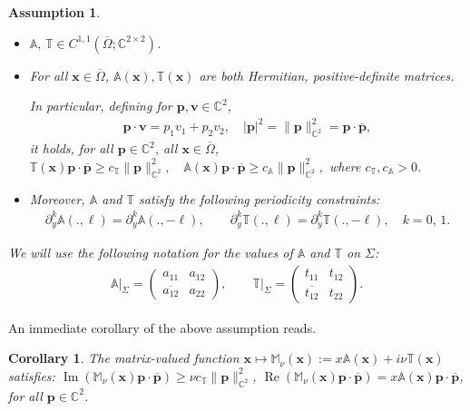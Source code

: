 \documentclass[report]{elsarticle}
\newtheorem{assumption}[theorem]{Assumption}
\newtheorem{corollary}[theorem]{Corollary}
\numberwithin{theorem}{section}
\newcommand{\bx}{\mathbf{x}}
\renewcommand{\Im}{\operatorname{Im}}
\renewcommand{\Re}{\operatorname{Re}}
\renewcommand{\vec}[1]{\mathbf{#1}}
\begin{document}
\begin{assumption}
	\label{assump:matrices}
	\begin{itemize}
		\item $\mathbb{A}, \, \mathbb{T}\in {C}^{1,1}(\overline{\Omega}; \mathbb{C}^{2\times 2})$. 
		\item For all $\bx\in \overline{\Omega}$, $\mathbb{A}(\bx), \mathbb{T}(\bx)$ are both Hermitian, positive-definite matrices. 
		
		
		In particular,
		defining for $\vec{p}, \vec{v}\in \mathbb{C}^2$, 
		\begin{align*}
			\vec{p}\cdot \vec{v}=p_1v_1+p_2v_2,\quad |\vec{p}|^2=\|\vec{p}\|_{\mathbb{C}^2}^2=\vec{p}\cdot\overline{\vec{p}},
		\end{align*}
		it holds, for all $\vec{p}\in \mathbb{C}^2$, all $\vec{x}\in \overline{\Omega}$,  $
		\mathbb{T}(\bx)\vec{p}\cdot\overline{\vec{p}}\geq c_{\mathbb{T}}\|\vec{p}\|^2_{\mathbb{C}^2}, \quad 			\mathbb{A}(\bx)\vec{p}\cdot\overline{\vec{p}}\geq c_{\mathbb{A}}\|\vec{p}\|^2_{\mathbb{C}^2}, $ where $c_{\mathbb{T}}, c_{\mathbb{A}}>0$. 
		\item  Moreover, $\mathbb{A}$ and $\mathbb{T}$ satisfy the following periodicity constraints: 
		\begin{align*}
			\partial_y^k\mathbb{A}(.,\ell)=	\partial_y^k\mathbb{A}(.,-\ell), \qquad 	\partial_y^k\mathbb{T}(.,\ell)=	\partial_y^k\mathbb{T}(.,-\ell), \quad k=0,\,1. 
		\end{align*}
	\end{itemize}
	We will use the following notation for the values of $\mathbb{A}$ and $\mathbb{T}$ on $\Sigma$:
	\begin{align*}
		\left.	\mathbb{A}\right|_{\Sigma}=\left(
		\begin{matrix}
			a_{11} & a_{12}\\
			\overline{a_{12}} & a_{22}
		\end{matrix}
		\right), \qquad \left.	\mathbb{T}\right|_{\Sigma}=\left(
		\begin{matrix}
			t_{11} & t_{12}\\
			\overline{t_{12}} & t_{22}
		\end{matrix}
		\right).
	\end{align*}
\end{assumption}
An immediate corollary of the above assumption reads.
\begin{corollary}
	\label{cor:M}
	The matrix-valued function  $\vec{x}\mapsto\mathbb{M}_{\nu}(\vec{x}):=x\mathbb{A}(\vec{x})+i\nu\mathbb{T}(\vec{x})$ satisfies: 
	$\operatorname{\Im}\left(\mathbb{M}_{\nu}(\vec{x})\vec{p}\cdot\overline{\vec{p}}\right)\geq \nu c_{\mathbb{T}}\|\vec{p}\|^2_{\mathbb{C}^2}$, $\operatorname{\Re}\left(\mathbb{M}_{\nu}(\vec{x})\vec{p}\cdot \overline{\vec{p}}\right)=x \mathbb{A}(\vec{x})\vec{p}\cdot\overline{\vec{p}}$, for all $\vec{p}\in \mathbb{C}^2$. 
\end{corollary}%
\end{document}

